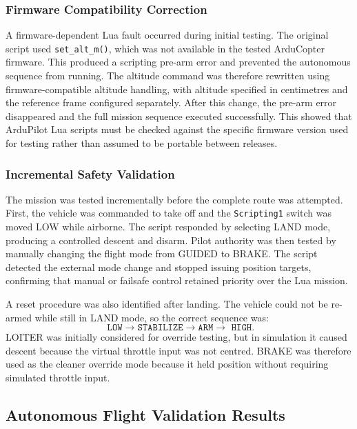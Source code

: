 \documentclass[conference]{IEEEtran}
\begin{document}
\subsubsection*{Firmware Compatibility Correction}

A firmware-dependent Lua fault occurred during initial testing. The original
script used \texttt{set\_alt\_m()}, which was not available in the tested
ArduCopter firmware. This produced a scripting pre-arm error and prevented the
autonomous sequence from running. The altitude command was therefore rewritten
using firmware-compatible altitude handling, with altitude specified in
centimetres and the reference frame configured separately. After this change,
the pre-arm error disappeared and the full mission sequence executed
successfully. This showed that ArduPilot Lua scripts must be checked against the
specific firmware version used for testing rather than assumed to be portable
between releases.

\subsubsection*{Incremental Safety Validation}

The mission was tested incrementally before the complete route was attempted.
First, the vehicle was commanded to take off and the \texttt{Scripting1} switch
was moved LOW while airborne. The script responded by selecting LAND mode,
producing a controlled descent and disarm. Pilot authority was then tested by
manually changing the flight mode from GUIDED to BRAKE. The script detected the
external mode change and stopped issuing position targets, confirming that
manual or failsafe control retained priority over the Lua mission.

A reset procedure was also identified after landing. The vehicle could not be
re-armed while still in LAND mode, so the correct sequence was:
\begin{equation}
    \texttt{ LOW}
    \rightarrow
    \texttt{STABILIZE}
    \rightarrow
    \texttt{ARM}
    \rightarrow
    \texttt{ HIGH}.
\end{equation}
LOITER was initially considered for override testing, but in simulation it
caused descent because the virtual throttle input was not centred. BRAKE was
therefore used as the cleaner override mode because it held position without
requiring simulated throttle input.


\subsection*{Autonomous Flight Validation Results}
\label{sec:lua-results}
\end{document}
